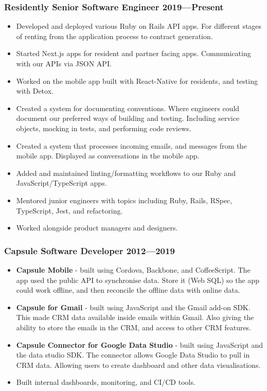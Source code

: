 \documentclass[a4paper]{article}
\newcommand{\datedsubsection}[2]{
  \subsubsection{#1 \hfill \textbf{#2}}
}
\begin{document}
\datedsubsection{\textbf{Residently} Senior Software Engineer}{2019---Present}
\begin{itemize}
  \item Developed and deployed various Ruby on Rails API apps. For different
    stages of renting from the application process to contract generation.
  \item Started Next.js apps for resident and partner facing apps. Communicating
    with our APIs via JSON API.
  \item Worked on the mobile app built with React-Native for residents, and
    testing with Detox.
  \item Created a system for documenting conventions. Where engineers could
    document our preferred ways of building and testing. Including service
    objects, mocking in tests, and performing code reviews.
  \item Created a system that processes incoming emails, and messages from the
    mobile app. Displayed as conversations in the mobile app.
  \item Added and maintained linting/formatting workflows to our Ruby and
    JavaScript/TypeScript apps.
  \item Mentored junior engineers with topics including Ruby, Rails, RSpec,
    TypeScript, Jest, and refactoring.
  \item Worked alongside product managers and designers.
\end{itemize}

\datedsubsection{\textbf{Capsule} Software Developer}{2012---2019}
\begin{itemize}
  \item \textbf{Capsule Mobile} - built using Cordova, Backbone, and
    CoffeeScript. The app used the public API to synchronise data. Store it
    (Web SQL) so the app could work offline, and then reconcile the offline data
    with online data.
  \item \textbf{Capsule for Gmail} - built using JavaScript and the Gmail add-on
    SDK. This made CRM data available inside emails within Gmail. Also giving
    the ability to store the emails in the CRM, and access to other CRM
    features.
  \item \textbf{Capsule Connector for Google Data Studio} - built using
    JavaScript and the data studio SDK. The connector allows Google Data Studio
    to pull in CRM data. Allowing users to create dashboard and other data
    visualisations.
  \item Built internal dashboards, monitoring, and CI/CD tools.
\end{itemize}
\end{document}
